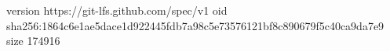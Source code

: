 version https://git-lfs.github.com/spec/v1
oid sha256:1864c6e1ae5dace1d922445fdb7a98c5e73576121bf8c890679f5c40ca9da7e9
size 174916
